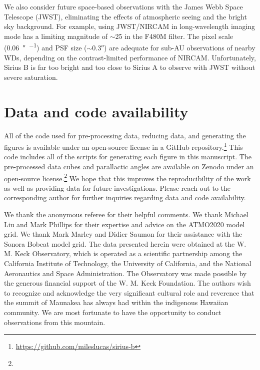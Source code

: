 \documentclass[twocolumn]{aastex631}
\begin{document}
We also consider future space-based observations with the James Webb Space Telescope (JWST), eliminating the effects of atmospheric seeing and the bright sky background. For example, using JWST/NIRCAM in long-wavelength imaging mode has a limiting magnitude of $\sim$25 in the F480M filter. The pixel scale (\qty{0.06}{\arcsecond\per\pixel}) and PSF size ($\sim$\ang{;;0.3}) are adequate for sub-AU observations of nearby WDs, depending on the contrast-limited performance of NIRCAM. Unfortunately, Sirius B is far too bright and too close to Sirius A to observe with JWST without severe saturation.

\section{Data and code availability}\label{sec:data}

All of the code used for pre-processing data, reducing data, and generating the figures is available under an open-source license in a GitHub repository.\footnote{\url{https://github.com/mileslucas/sirius-b}} This code includes all of the scripts for generating each figure in this manuscript. The pre-processed data cubes and parallactic angles are available on Zenodo under an open-source license.\footnote{} We hope that this improves the reproducibility of the work as well as providing data for future investigations. Please reach out to the corresponding author for further inquiries regarding data and code availability.

\begin{acknowledgements}
We thank the anonymous referee for their helpful comments. We thank Michael Liu and Mark Phillips for their expertise and advice on the ATMO2020 model grid. We thank Mark Marley and Didier Saumon for their assistance with the Sonora Bobcat model grid. The data presented herein were obtained at the W. M. Keck Observatory, which is operated as a scientific partnership among the California Institute of Technology, the University of California, and the National Aeronautics and Space Administration. The Observatory was made possible by the generous financial support of the W. M. Keck Foundation. The authors wish to recognize and acknowledge the very significant cultural role and reverence that the summit of Maunakea has always had within the indigenous Hawaiian community. We are most fortunate to have the opportunity to conduct observations from this mountain.
\end{acknowledgements}
\end{document}
